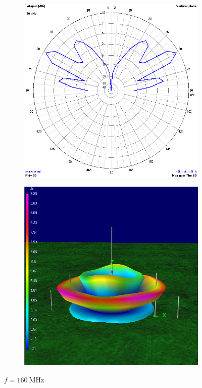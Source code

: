 \begin{figure}[H]
	\begin{subfigure}{0.5\textwidth}
		\includegraphics[scale=0.43]{imagenes/2D_160MHz_tierra.png}
	\end{subfigure}	
	\quad
	\begin{subfigure}{0.5\textwidth}
		\includegraphics[scale=0.43]{imagenes/3D_160MHz_tierra.png}
	\end{subfigure}
	\caption{$f=\SI{160}{\mega\hertz}$}
	\label{fig.radiacion_160M_tierra}
\end{figure}


